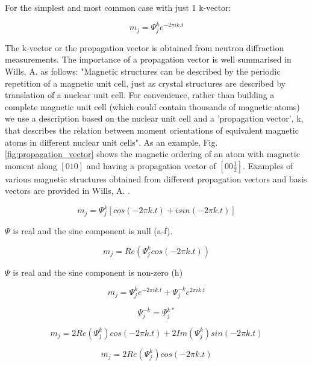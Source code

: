 \documentclass[letterpaper,10pt,doublespacing,edeposit]{uiucthesis2020}
\begin{document}
\begin{mainmatter}
For the simplest and most common case with just 1 k-vector:

\begin{equation}
m_j = \Psi_j^k e^{-2\pi ik.t}
\end{equation}

The k-vector or the propagation vector is obtained from neutron diffraction measurements. The importance of a propagation vector is well summarised in Wills, A. \cite{Wills2001} as follows: "Magnetic structures can be described by the periodic repetition of a magnetic unit cell, just as crystal structures are described by translation of a nuclear unit cell. For convenience, rather than building a complete magnetic unit cell (which could contain thousands of magnetic atoms) we use a description based on the nuclear unit cell and a 'propagation vector', k, that describes the relation between moment orientations of equivalent magnetic atoms in different nuclear unit cells". As an example, Fig. \ref{fig:propagation_vector} shows the magnetic ordering of an atom with magnetic moment along $[010]$ and having a propagation vector of $[00\frac{1}{2}]$. Examples of various magnetic structures obtained from different propagation vectors and basis vectors are provided in Wills, A. \cite{Wills2001}.

\iffalse
\begin{equation}
m_j = \Psi_j^k [cos(-2\pi k.t) + isin(-2\pi k.t)]
\end{equation}

$\Psi$ is real and the sine component is null (a-f).

\begin{equation}
m_j = Re(\Psi_j^k cos(-2\pi k.t))
\end{equation}

$\Psi$ is real and the sine component is non-zero (h)

\begin{equation}
m_j = \Psi_j^k e^{-2\pi ik.t} + \Psi_j^{-k} e^{2\pi ik.t}
\end{equation}

\begin{equation}
\Psi_j^{-k} = \Psi_j^{k*}
\end{equation}

\begin{equation}
m_j = 2Re(\Psi_j^k) cos(-2\pi k.t) + 2Im(\Psi_j^k) sin(-2\pi k.t)
\end{equation}

\begin{equation}
m_j = 2Re(\Psi_j^k) cos(-2\pi k.t)
\end{equation}



\end{mainmatter}
\end{document}
